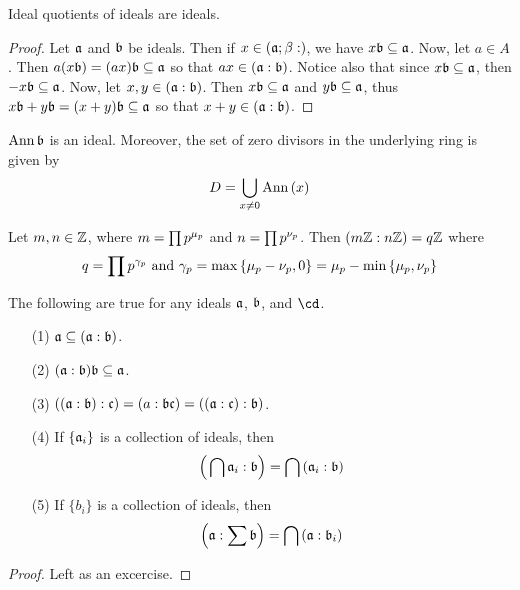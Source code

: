 \begin{lemma}\label{1.6.8}
    Ideal quotients of ideals are ideals.
\end{lemma}
\begin{proof}
    Let $\af$ and $\bf$ be ideals. Then if $x \in (\af;\b:)$, we have $x\bf
    \subseteq \af$. Now, let $a \in A$. Then $a(x\bf)=(ax)\bf \subseteq \af$ so
    that $ax \in (\af:\bf)$. Notice also that since $x\bf \subseteq \af$, then
    $-x\bf \subseteq \af$. Now, let $x,y \in (\af:\bf)$. Then $x\bf \subseteq
    \af$ and $y\bf \subseteq \af$, thus $x\bf+y\bf=(x+y)\bf \subseteq \af$ so
    that $x+y \in (\af:\bf)$.
\end{proof}
\begin{corollary}
    $\Ann{\bf}$ is an ideal. Moreover, the set of zero divisors in the
    underlying ring is given by
    \begin{equation*}
        D=\bigcup_{x \neq 0}{\Ann{(x)}}
    \end{equation*}
\end{corollary}

\begin{example}\label{example_1.7}
    Let $m,n \in \Z$, where  $m=\prod{p^{\m_p}}$ and $n=\prod{p^{\v_p}}$. Then
    $(m\Z:n\Z)=q\Z$ where
    \begin{equation*}
        q=\prod{p^{\y_p}} \text{ and }
        \y_p=\max{\{\m_p-\v_p,0\}}=\m_p-\min{\{\m_p,\v_p\}}
    \end{equation*}
\end{example}

\begin{lemma}\label{1.6.9}
    The following are true for any ideals $\af$,  $\bf$, and  $\cd$.
    \begin{enumerate}
        \item[(1)] $\af \subseteq (\af:\bf)$.

        \item[(2)] $(\af:\bf)\bf \subseteq \af$.

        \item[(3)] $((\af:\bf):\cf)=(a:\bf\cf)=((\af:\cf):\bf)$.

        \item[(4)] If $\{\af_i\}$ is a collection of ideals, then
            \begin{equation*}
                \Big{(} \bigcap{\af_i}:\bf \Big{)}=\bigcap{(\af_i:\bf)}
            \end{equation*}

        \item[(5)] If $\{b_i\}$ is a collection of ideals, then
            \begin{equation*}
                \Big{(} \af:\sum{\bf} \Big{)}=\bigcap{(\af:\bf_i)}
            \end{equation*}
    \end{enumerate}
\end{lemma}
\begin{proof}
    Left as an excercise.
\end{proof}

